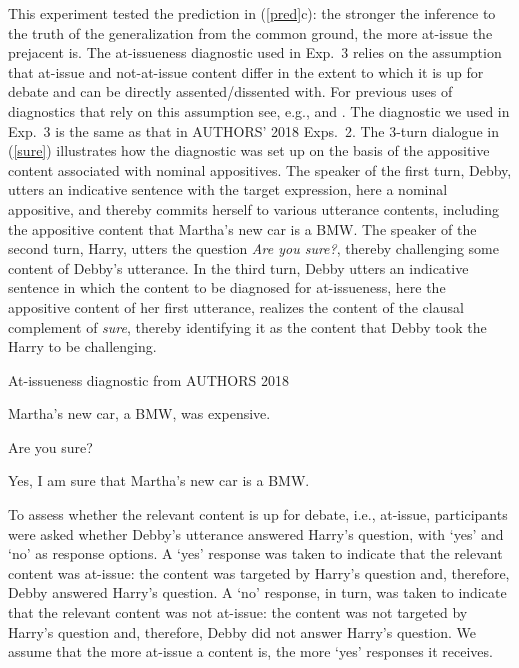 \documentclass[11pt,fleqn]{article}
\newcommand{\6}{\mbox{$[\hspace*{-.6mm}[$}}
\newcommand{\9}{\mbox{$]\hspace*{-.6mm}]$}}
\begin{document}
This experiment tested the prediction in (\ref{pred}c): the stronger the inference to the truth of the generalization from the common ground, the more at-issue the prejacent is. The at-issueness diagnostic used in Exp.~3 relies on the assumption that at-issue and not-at-issue content differ in the extent to which it is up for debate and can be directly assented/dissented with. For previous uses of diagnostics that rely on this assumption see, e.g., \citealt{amaral-etal07,xue-onea11,murray2014,anderbois-etal2015,destruel-etal2015,tonhauser-sula6} and \citealt{syrett-koev2015}. The diagnostic we used in Exp.~3 is the same as that in AUTHORS' 2018 Exps.~2. The 3-turn dialogue in (\ref{sure}) illustrates how the diagnostic was set up on the basis of the appositive content associated with nominal appositives. The speaker of the first turn, Debby, utters an indicative sentence with the target expression, here a nominal appositive, and thereby commits herself to various utterance contents, including the appositive content that Martha's new car is a BMW. The speaker of the second turn, Harry, utters the question {\em Are you sure?}, thereby challenging some content of Debby's utterance. In the third turn, Debby utters an indicative sentence in which the content to be diagnosed for at-issueness, here the appositive content of her first utterance, realizes the content of the clausal complement of {\em sure}, thereby identifying it as the content that Debby took the Harry to be challenging. 

\begin{exe}
\ex\label{sure} At-issueness diagnostic from AUTHORS 2018
\begin{xlist}
 Martha's new car, a BMW, was expensive.

 Are you sure?
	
 Yes, I am sure that Martha's new car is a BMW. 
\end{xlist}
\end{exe}

To assess whether the relevant content is up for debate, i.e., at-issue, participants were asked whether Debby's utterance answered Harry's question, with `yes' and `no' as response options. A `yes' response was taken to indicate that the relevant content was at-issue: the content was targeted by Harry's question and, therefore, Debby answered Harry's question. A `no' response, in turn, was taken to indicate that the relevant content was not at-issue: the content was not targeted by Harry's question and, therefore, Debby did not answer Harry's question. We assume that the more at-issue a content is, the more `yes' responses it receives.
\end{document}

